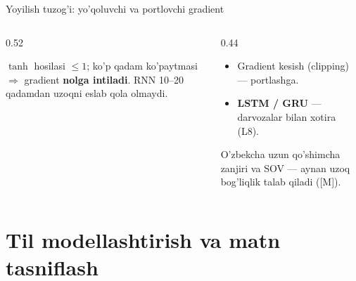 \documentclass[aspectratio=169,11pt]{beamer}
\begin{document}
\begin{frame}{Yoyilish tuzog'i: yo'qoluvchi va portlovchi gradient}
  \begin{columns}[T]
    \begin{column}{0.52\textwidth}
      \begin{tcolorbox}[warnbox,title=Uzoq bog'liqlik so'nadi]
        \small
        $\tanh$ hosilasi $\leq 1$; ko'p qadam ko'paytmasi $\Rightarrow$ gradient
        \textbf{nolga intiladi}. RNN 10--20 qadamdan uzoqni eslab qola olmaydi.
      \end{tcolorbox}
    \end{column}
    \begin{column}{0.44\textwidth}
      \begin{tcolorbox}[okbox,title=Yechimlar,top=2pt,bottom=2pt]
        \small
        \begin{itemize}\setlength\itemsep{1pt}
          \item Gradient kesish (clipping) --- portlashga.
          \item \textbf{LSTM / GRU} --- darvozalar bilan xotira (L8).
        \end{itemize}
      \end{tcolorbox}
      \vspace{3pt}
      \footnotesize\color{halfgray}
      O'zbekcha uzun qo'shimcha zanjiri va SOV --- aynan uzoq bog'liqlik talab
      qiladi ([M]).
    \end{column}
  \end{columns}
\end{frame}

\section[Qo'llash]{Til modellashtirish va matn tasniflash}
\end{document}
